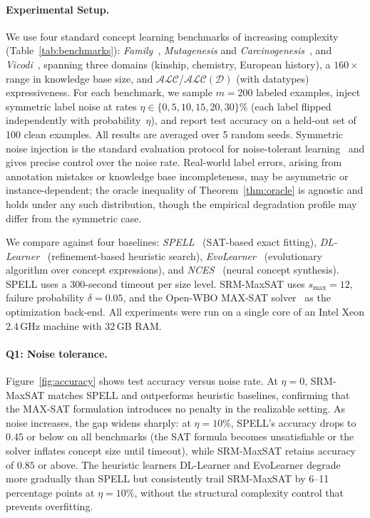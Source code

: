 \documentclass[accepted]{uai2026} %
\theoremstyle{definition}
\theoremstyle{remark}
\begin{document}
\paragraph{Experimental Setup.}
We use four standard concept learning
benchmarks of
increasing complexity (Table~\ref{tab:benchmarks}):
\emph{Family}~\citep{DBLP:conf/www/HeindorfBDWGDN22},
\emph{Mutagenesis} and
\emph{Carcinogenesis}~\citep{DBLP:journals/semweb/WestphalBBJL19},
and \emph{Vicodi}~\citep{DBLP:conf/esws/KouagouHDN23}, spanning
three domains (kinship, chemistry, European history), a
$160{\times}$ range in knowledge base size, and
$\mathcal{ALC}$/$\mathcal{ALC}(\mathcal{D})$
(with datatypes) expressiveness.
For each benchmark, we sample $m = 200$ labeled examples,
inject symmetric label noise at rates
$\eta \in \{0, 5, 10, 15, 20, 30\}\%$ (each label flipped
independently with probability~$\eta$), and report test accuracy
on a held-out set of 100 clean examples. All results are averaged
over 5 random seeds.
Symmetric noise injection is the standard evaluation protocol
for noise-tolerant learning~\citep{DBLP:journals/ml/KearnsSS94} and
gives precise control over the noise rate. Real-world label
errors, arising from annotation mistakes or knowledge base
incompleteness, may be asymmetric or instance-dependent; the
oracle inequality of Theorem~\ref{thm:oracle} is agnostic and
holds under any such distribution, though the empirical
degradation profile may differ from the symmetric case.

We compare against four baselines:
\emph{SPELL}~\citep{DBLP:conf/ijcai/CateFJL23}
(SAT-based exact fitting),
\emph{DL-Learner}~\citep{DBLP:journals/ml/LehmannH10}
(refinement-based heuristic search),
\emph{EvoLearner}~\citep{DBLP:conf/www/HeindorfBDWGDN22}
(evolutionary algorithm over concept expressions),
and \emph{NCES}~\citep{DBLP:conf/esws/KouagouHDN23}
(neural concept synthesis).
SPELL uses a 300-second timeout per size level.
SRM-MaxSAT uses $s_{\max} = 12$, failure
probability $\delta = 0.05$,
and the Open-WBO MAX-SAT
solver~\citep{DBLP:conf/sat/MartinsML14}
as the optimization back-end.  All experiments were run on a
single core of an Intel Xeon 2.4\,GHz machine with 32\,GB RAM.

\paragraph{Q1: Noise tolerance.}
Figure~\ref{fig:accuracy} shows test accuracy
versus noise rate. At $\eta = 0$, SRM-MaxSAT matches SPELL and
outperforms heuristic baselines, confirming that the MAX-SAT
formulation introduces no penalty in the realizable setting.
As noise increases, the gap widens sharply: at $\eta = 10\%$,
SPELL's accuracy drops to $0.45$ or below on all benchmarks (the SAT
formula becomes unsatisfiable or the solver inflates concept size
until timeout), while SRM-MaxSAT retains accuracy
of $0.85$ or above.
The heuristic learners DL-Learner and EvoLearner degrade more
gradually than SPELL but consistently trail SRM-MaxSAT
by 6--11 percentage points at $\eta = 10\%$, without the
structural complexity control that prevents overfitting.
\end{document}
